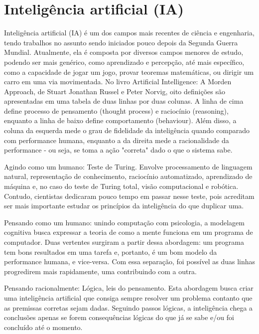 % 
\section{Inteligência artificial (IA)}
\label{sec:ia}

Inteligência artificial (IA) é um dos campos mais recentes de ciência e engenharia, tendo trabalhos no assunto sendo iniciados pouco depois da Segunda Guerra Mundial. Atualmente, ela é composta por diversos campos menores de estudo, podendo ser mais genérico, como aprendizado e percepção, até mais específico, como a capacidade de jogar um jogo, provar teoremas matemáticas, ou dirigir um carro em uma via movimentada.
No livro Artificial Intelligence: A Morden Approach, de Stuart Jonathan Russel e Peter Norvig, oito definições são apresentadas em uma tabela de duas linhas por duas colunas. A linha de cima define processo de pensamento (thought process) e raciocínio (reasoning), enquanto a linha de baixo define comportamento (behaviour). Além disso, a coluna da esquerda mede o grau de fidelidade da inteligência quando comparado com performance humana, enquanto a da direita mede a racionalidade da performance - ou seja, se toma a ação "correta" dado o que o sistema sabe.


Agindo como um humano: Teste de Turing. Envolve processamento de linguagem natural, representação de conhecimento, raciocínio automatizado, aprendizado de máquina e, no caso do teste de Turing total, visão computacional e robótica. Contudo, cientistas dedicaram pouco tempo em passar nesse teste, pois acreditam ser mais importante estudar os princípios da inteligência do que duplicar uma.

Pensando como um humano: unindo computação com psicologia, a modelagem cognitiva busca expressar a teoria de como a mente funciona em um programa de computador. Duas vertentes surgiram a partir dessa abordagem: um programa tem bons resultados em uma tarefa e, portanto, é um bom modelo da performance humana, e vice-versa. Com essa separação, foi possível as duas linhas progredirem mais rapidamente, uma contribuindo com a outra.

Pensando racionalmente: Lógica, leis do pensamento. Esta abordagem busca criar uma inteligência artificial que consiga sempre resolver um problema contanto que as premissas corretas sejam dadas. Seguindo passos lógicas, a inteligência chega a conclusões apenas se forem consequências lógicas do que já se sabe e/ou foi concluído até o momento.

